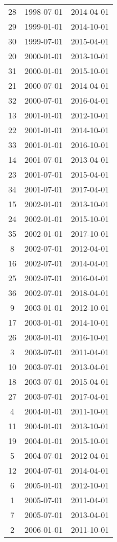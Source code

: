 % 
\begin{tabular}{ccc}
  \hline
  \hline
28 & 1998-07-01 & 2014-04-01 \\ 
  29 & 1999-01-01 & 2014-10-01 \\ 
  30 & 1999-07-01 & 2015-04-01 \\ 
  20 & 2000-01-01 & 2013-10-01 \\ 
  31 & 2000-01-01 & 2015-10-01 \\ 
  21 & 2000-07-01 & 2014-04-01 \\ 
  32 & 2000-07-01 & 2016-04-01 \\ 
  13 & 2001-01-01 & 2012-10-01 \\ 
  22 & 2001-01-01 & 2014-10-01 \\ 
  33 & 2001-01-01 & 2016-10-01 \\ 
  14 & 2001-07-01 & 2013-04-01 \\ 
  23 & 2001-07-01 & 2015-04-01 \\ 
  34 & 2001-07-01 & 2017-04-01 \\ 
  15 & 2002-01-01 & 2013-10-01 \\ 
  24 & 2002-01-01 & 2015-10-01 \\ 
  35 & 2002-01-01 & 2017-10-01 \\ 
  8 & 2002-07-01 & 2012-04-01 \\ 
  16 & 2002-07-01 & 2014-04-01 \\ 
  25 & 2002-07-01 & 2016-04-01 \\ 
  36 & 2002-07-01 & 2018-04-01 \\ 
  9 & 2003-01-01 & 2012-10-01 \\ 
  17 & 2003-01-01 & 2014-10-01 \\ 
  26 & 2003-01-01 & 2016-10-01 \\ 
  3 & 2003-07-01 & 2011-04-01 \\ 
  10 & 2003-07-01 & 2013-04-01 \\ 
  18 & 2003-07-01 & 2015-04-01 \\ 
  27 & 2003-07-01 & 2017-04-01 \\ 
  4 & 2004-01-01 & 2011-10-01 \\ 
  11 & 2004-01-01 & 2013-10-01 \\ 
  19 & 2004-01-01 & 2015-10-01 \\ 
  5 & 2004-07-01 & 2012-04-01 \\ 
  12 & 2004-07-01 & 2014-04-01 \\ 
  6 & 2005-01-01 & 2012-10-01 \\ 
  1 & 2005-07-01 & 2011-04-01 \\ 
  7 & 2005-07-01 & 2013-04-01 \\ 
  2 & 2006-01-01 & 2011-10-01 \\ 
   \hline
\end{tabular}
